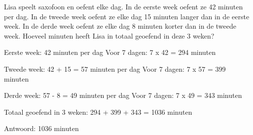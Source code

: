 \begin{opgave}
Lisa speelt saxofoon en oefent elke dag. In de eerste week oefent ze 42 
minuten per dag. In de tweede week oefent ze elke dag 15 minuten langer dan 
in de eerste week. In de derde week oefent ze elke dag 8 minuten korter dan 
in de tweede week. Hoeveel minuten heeft Lisa in totaal geoefend in deze 3 
weken?
\end{opgave}

\begin{oplossing}
Eerste week: 42 minuten per dag
Voor 7 dagen: 7 x 42 = 294 minuten

Tweede week: 42 + 15 = 57 minuten per dag
Voor 7 dagen: 7 x 57 = 399 minuten

Derde week: 57 - 8 = 49 minuten per dag
Voor 7 dagen: 7 x 49 = 343 minuten

Totaal geoefend in 3 weken:
294 + 399 + 343 = 1036 minuten

Antwoord: 1036 minuten
\end{oplossing}